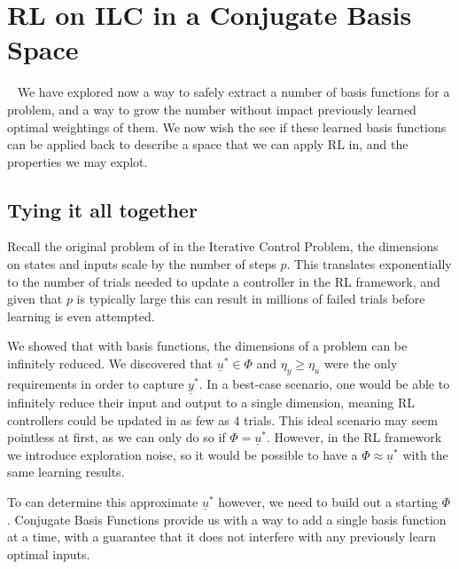 
\FloatBarrier\section{RL on ILC in a Conjugate Basis Space}
~\label{sec:rl_on_conjugate_basis_ilc}
We have explored now a way to safely extract a number of basis functions for a problem, and a way to grow the number without impact previously learned optimal weightings of them. We now wish the see if these learned basis functions can be applied back to describe a space that we can apply RL in, and the properties we may explot.

\FloatBarrier\subsection{Tying it all together}
Recall the original problem of in the Iterative Control Problem, the dimensions on states and inputs scale by the number of steps $p$. This translates exponentially to the number of trials needed to update a controller in the \ac{RL} framework, and given that $p$ is typically large this can result in millions of failed trials before learning is even attempted.

We showed that with basis functions, the dimensions of a problem can be infinitely reduced. We discovered that $\underline{u}^\ast \in \Phi$ and $\eta_y \geq \eta_u$ were the only requirements in order to capture $\underline{y}^\ast$. In a best-case scenario, one would be able to infinitely reduce their input and output to a single dimension, meaning RL controllers could be updated in as few as $4$ trials. This ideal scenario may seem pointless at first, as we can only do so if $\Phi = \underline{u}^\ast$. However, in the RL framework we introduce exploration noise, so it would be possible to have a $\Phi \approx \underline{u}^\ast$ with the same learning results.

To can determine this approximate $\underline{u}^\ast$ however, we need to build out a starting $\Phi$. Conjugate Basis Functions provide us with a way to add a single basis function at a time, with a guarantee that it does not interfere with any previously learn optimal inputs. 

